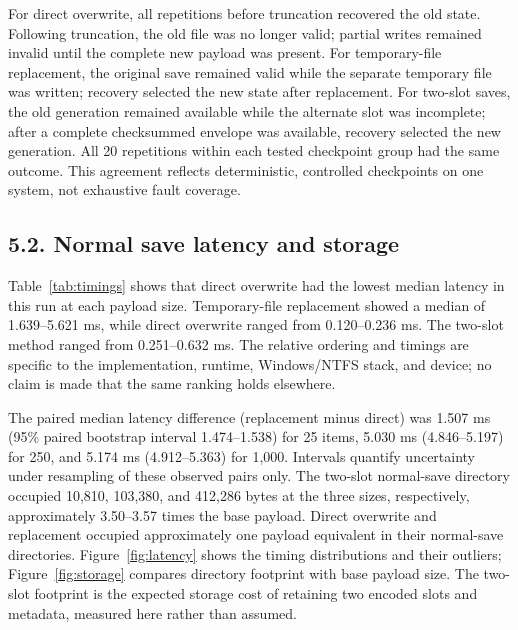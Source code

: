 \documentclass{jepcs}
\begin{document}
For direct overwrite, all repetitions before truncation recovered the old state. Following truncation, the old file was no longer valid; partial writes remained invalid until the complete new payload was present. For temporary-file replacement, the original save remained valid while the separate temporary file was written; recovery selected the new state after replacement. For two-slot saves, the old generation remained available while the alternate slot was incomplete; after a complete checksummed envelope was available, recovery selected the new generation. All 20 repetitions within each tested checkpoint group had the same outcome. This agreement reflects deterministic, controlled checkpoints on one system, not exhaustive fault coverage.

\subsection{5.2. Normal save latency and storage}
Table~\ref{tab:timings} shows that direct overwrite had the lowest median latency in this run at each payload size. Temporary-file replacement showed a median of 1.639--5.621 ms, while direct overwrite ranged from 0.120--0.236 ms. The two-slot method ranged from 0.251--0.632 ms. The relative ordering and timings are specific to the implementation, runtime, Windows/NTFS stack, and device; no claim is made that the same ranking holds elsewhere.

The paired median latency difference (replacement minus direct) was 1.507 ms (95\% paired bootstrap interval 1.474--1.538) for 25 items, 5.030 ms (4.846--5.197) for 250, and 5.174 ms (4.912--5.363) for 1,000. Intervals quantify uncertainty under resampling of these observed pairs only. The two-slot normal-save directory occupied 10,810, 103,380, and 412,286 bytes at the three sizes, respectively, approximately 3.50--3.57 times the base payload. Direct overwrite and replacement occupied approximately one payload equivalent in their normal-save directories. Figure~\ref{fig:latency} shows the timing distributions and their outliers; Figure~\ref{fig:storage} compares directory footprint with base payload size. The two-slot footprint is the expected storage cost of retaining two encoded slots and metadata, measured here rather than assumed.
\end{document}
